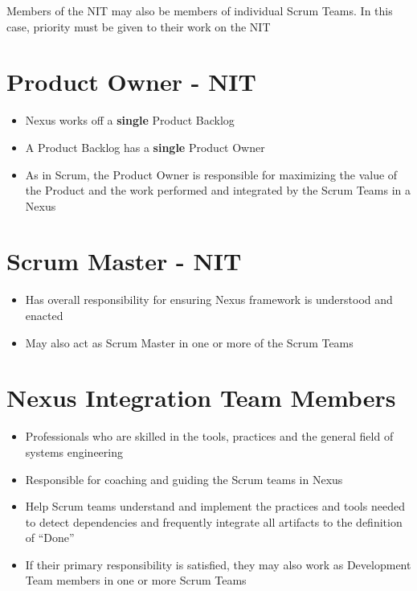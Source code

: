 \documentclass[a4paper,11pt,twocolumn]{article}
\begin{document}
\begin{tcolorbox}[colback=black!8!white,colframe=gray!50!black,title=Note,sharp corners,fonttitle=\normalsize\bfseries,fontupper=\normalsize]
	Members of the NIT may also be members of individual Scrum Teams. In this case, priority must be given to their work on the NIT
\end{tcolorbox}

\section*{Product Owner - NIT}
\begin{itemize}
	\item Nexus works off a \textbf{single} Product Backlog
	\item A Product Backlog has a \textbf{single} Product Owner
	\item As in Scrum, the Product Owner is responsible for maximizing the value of the Product and the work performed and integrated by the Scrum Teams in a Nexus
\end{itemize}

\section*{Scrum Master - NIT}
\begin{itemize}
	\item Has overall responsibility for ensuring Nexus framework is understood and enacted
	\item May also act as Scrum Master in one or more of the Scrum Teams
\end{itemize}

\section*{Nexus Integration Team Members}
\begin{itemize}
    \item Professionals who are skilled in the tools, practices and the general field of systems engineering
	\item Responsible for coaching and guiding the Scrum teams in Nexus
	\item Help Scrum teams understand and implement the practices and tools needed to detect dependencies and frequently integrate all artifacts to the definition of ``Done''
	\item If their primary responsibility is satisfied, they may also work as Development Team members in one or more Scrum Teams
\end{itemize}
\end{document}
